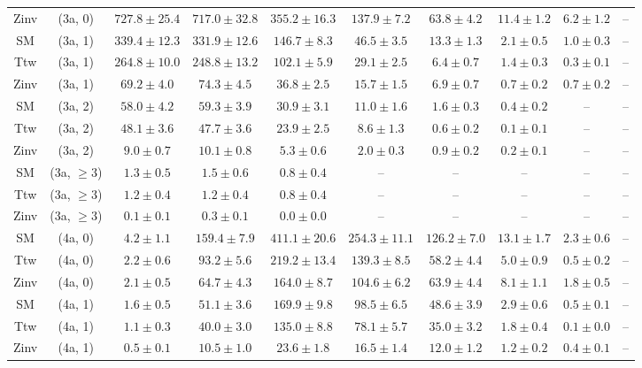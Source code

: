 \begin{table}[h!]
{\begin{tabular}{cccccccccc}
	Zinv & (3a, 0) & $727.8\pm 25.4$ & $717.0\pm 32.8$ & $355.2\pm 16.3$ & $137.9\pm 7.2$ & $63.8\pm 4.2$ & $11.4\pm 1.2$ & $6.2\pm 1.2$ & -- \\[0.5ex] 
	SM & (3a, 1) & $339.4\pm 12.3$ & $331.9\pm 12.6$ & $146.7\pm 8.3$ & $46.5\pm 3.5$ & $13.3\pm 1.3$ & $2.1\pm 0.5$ & $1.0\pm 0.3$ & -- \\[0.5ex] 
	Ttw & (3a, 1) & $264.8\pm 10.0$ & $248.8\pm 13.2$ & $102.1\pm 5.9$ & $29.1\pm 2.5$ & $6.4\pm 0.7$ & $1.4\pm 0.3$ & $0.3\pm 0.1$ & -- \\[0.5ex] 
	Zinv & (3a, 1) & $69.2\pm 4.0$ & $74.3\pm 4.5$ & $36.8\pm 2.5$ & $15.7\pm 1.5$ & $6.9\pm 0.7$ & $0.7\pm 0.2$ & $0.7\pm 0.2$ & -- \\[0.5ex] 
	SM & (3a, 2) & $58.0\pm 4.2$ & $59.3\pm 3.9$ & $30.9\pm 3.1$ & $11.0\pm 1.6$ & $1.6\pm 0.3$ & $0.4\pm 0.2$ & -- & -- \\[0.5ex] 
	Ttw & (3a, 2) & $48.1\pm 3.6$ & $47.7\pm 3.6$ & $23.9\pm 2.5$ & $8.6\pm 1.3$ & $0.6\pm 0.2$ & $0.1\pm 0.1$ & -- & -- \\[0.5ex] 
	Zinv & (3a, 2) & $9.0\pm 0.7$ & $10.1\pm 0.8$ & $5.3\pm 0.6$ & $2.0\pm 0.3$ & $0.9\pm 0.2$ & $0.2\pm 0.1$ & -- & -- \\[0.5ex] 
	SM & (3a, $\ge3$) & $1.3\pm 0.5$ & $1.5\pm 0.6$ & $0.8\pm 0.4$ & -- & -- & -- & -- & -- \\[0.5ex] 
	Ttw & (3a, $\ge3$) & $1.2\pm 0.4$ & $1.2\pm 0.4$ & $0.8\pm 0.4$ & -- & -- & -- & -- & -- \\[0.5ex] 
	Zinv & (3a, $\ge3$) & $0.1\pm 0.1$ & $0.3\pm 0.1$ & $0.0\pm 0.0$ & -- & -- & -- & -- & -- \\[0.5ex] 
	SM & (4a, 0) & $4.2\pm 1.1$ & $159.4\pm 7.9$ & $411.1\pm 20.6$ & $254.3\pm 11.1$ & $126.2\pm 7.0$ & $13.1\pm 1.7$ & $2.3\pm 0.6$ & -- \\[0.5ex] 
	Ttw & (4a, 0) & $2.2\pm 0.6$ & $93.2\pm 5.6$ & $219.2\pm 13.4$ & $139.3\pm 8.5$ & $58.2\pm 4.4$ & $5.0\pm 0.9$ & $0.5\pm 0.2$ & -- \\[0.5ex] 
	Zinv & (4a, 0) & $2.1\pm 0.5$ & $64.7\pm 4.3$ & $164.0\pm 8.7$ & $104.6\pm 6.2$ & $63.9\pm 4.4$ & $8.1\pm 1.1$ & $1.8\pm 0.5$ & -- \\[0.5ex] 
	SM & (4a, 1) & $1.6\pm 0.5$ & $51.1\pm 3.6$ & $169.9\pm 9.8$ & $98.5\pm 6.5$ & $48.6\pm 3.9$ & $2.9\pm 0.6$ & $0.5\pm 0.1$ & -- \\[0.5ex] 
	Ttw & (4a, 1) & $1.1\pm 0.3$ & $40.0\pm 3.0$ & $135.0\pm 8.8$ & $78.1\pm 5.7$ & $35.0\pm 3.2$ & $1.8\pm 0.4$ & $0.1\pm 0.0$ & -- \\[0.5ex] 
	Zinv & (4a, 1) & $0.5\pm 0.1$ & $10.5\pm 1.0$ & $23.6\pm 1.8$ & $16.5\pm 1.4$ & $12.0\pm 1.2$ & $1.2\pm 0.2$ & $0.4\pm 0.1$ & -- \\[0.5ex] 

\end{tabular}}
\end{table}
